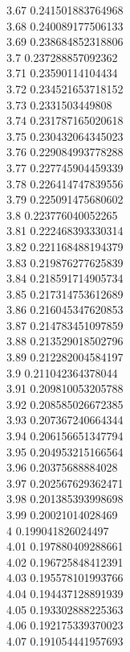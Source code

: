 {3.67	0.241501883764968\\
3.68	0.240089177506133\\
3.69	0.238684852318806\\
3.7	0.237288857092362\\
3.71	0.23590114104434\\
3.72	0.234521653718152\\
3.73	0.2331503449808\\
3.74	0.231787165020618\\
3.75	0.230432064345023\\
3.76	0.229084993778288\\
3.77	0.227745904459339\\
3.78	0.226414747839556\\
3.79	0.225091475680602\\
3.8	0.223776040052265\\
3.81	0.222468393330314\\
3.82	0.221168488194379\\
3.83	0.219876277625839\\
3.84	0.218591714905734\\
3.85	0.217314753612689\\
3.86	0.216045347620853\\
3.87	0.214783451097859\\
3.88	0.213529018502796\\
3.89	0.212282004584197\\
3.9	0.211042364378044\\
3.91	0.209810053205788\\
3.92	0.208585026672385\\
3.93	0.207367240664344\\
3.94	0.206156651347794\\
3.95	0.204953215166564\\
3.96	0.20375688884028\\
3.97	0.202567629362471\\
3.98	0.201385393998698\\
3.99	0.20021014028469\\
4	0.199041826024497\\
4.01	0.197880409288661\\
4.02	0.196725848412391\\
4.03	0.195578101993766\\
4.04	0.194437128891939\\
4.05	0.193302888225363\\
4.06	0.192175339370023\\
4.07	0.191054441957693\\
}
